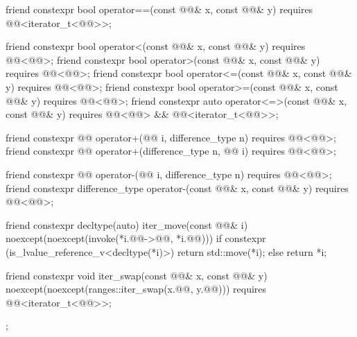 \begin{codeblock}
{{    friend constexpr bool operator==(const @@& x, const @@& y)
      requires @@<iterator_t<@@>>;

    friend constexpr bool operator<(const @@& x, const @@& y)
      requires @@<@@>;
    friend constexpr bool operator>(const @@& x, const @@& y)
      requires @@<@@>;
    friend constexpr bool operator<=(const @@& x, const @@& y)
      requires @@<@@>;
    friend constexpr bool operator>=(const @@& x, const @@& y)
      requires @@<@@>;
    friend constexpr auto operator<=>(const @@& x, const @@& y)
      requires @@<@@> && @@<iterator_t<@@>>;

    friend constexpr @@ operator+(@@ i, difference_type n)
      requires @@<@@>;
    friend constexpr @@ operator+(difference_type n, @@ i)
      requires @@<@@>;

    friend constexpr @@ operator-(@@ i, difference_type n)
      requires @@<@@>;
    friend constexpr difference_type operator-(const @@& x, const @@& y)
      requires @@<@@>;

    friend constexpr decltype(auto) iter_move(const @@& i)
      noexcept(noexcept(invoke(*i.@@->@@, *i.@@)))
    {
      if constexpr (is_lvalue_reference_v<decltype(*i)>)
        return std::move(*i);
      else
        return *i;
    }

    friend constexpr void iter_swap(const @@& x, const @@& y)
      noexcept(noexcept(ranges::iter_swap(x.@@, y.@@)))
      requires @@<iterator_t<@@>>;
  };
}
\end{codeblock}

